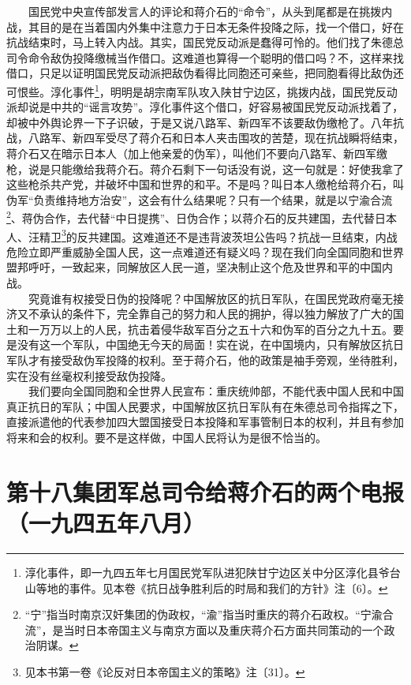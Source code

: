 \documentclass[cn,11pt,chinese]{elegantbook}
\def\myformat#1{\hfil\hfil #1}
\begin{document}
　　国民党中央宣传部发言人的评论和蒋介石的“命令”，从头到尾都是在挑拨内战，其目的是在当着国内外集中注意力于日本无条件投降之际，找一个借口，好在抗战结束时，马上转入内战。其实，国民党反动派是蠢得可怜的。他们找了朱德总司令命令敌伪投降缴械当作借口。这难道也算得一个聪明的借口吗？不，这样来找借口，只足以证明国民党反动派把敌伪看得比同胞还可亲些，把同胞看得比敌伪还可恨些。淳化事件\footnote[5]{ 淳化事件，即一九四五年七月国民党军队进犯陕甘宁边区关中分区淳化县爷台山等地的事件。见本卷《抗日战争胜利后的时局和我们的方针》注〔6〕。}，明明是胡宗南军队攻入陕甘宁边区，挑拨内战，国民党反动派却说是中共的“谣言攻势”。淳化事件这个借口，好容易被国民党反动派找着了，却被中外舆论界一下子识破，于是又说八路军、新四军不该要敌伪缴枪了。八年抗战，八路军、新四军受尽了蒋介石和日本人夹击围攻的苦楚，现在抗战瞬将结束，蒋介石又在暗示日本人（加上他亲爱的伪军），叫他们不要向八路军、新四军缴枪，说是只能缴给我蒋介石。蒋介石剩下一句话没有说，这一句就是：好使我拿了这些枪杀共产党，并破坏中国和世界的和平。不是吗？叫日本人缴枪给蒋介石，叫伪军“负责维持地方治安”，这会有什么结果呢？只有一个结果，就是以宁渝合流\footnote[6]{ “宁”指当时南京汉奸集团的伪政权，“渝”指当时重庆的蒋介石政权。“宁渝合流”，是当时日本帝国主义与南京方面以及重庆蒋介石方面共同策动的一个政治阴谋。}、蒋伪合作，去代替“中日提携”、日伪合作；以蒋介石的反共建国，去代替日本人、汪精卫\footnote[7]{ 见本书第一卷《论反对日本帝国主义的策略》注〔31〕。}的反共建国。这难道还不是违背波茨坦公告吗？抗战一旦结束，内战危险立即严重威胁全国人民，这一点难道还有疑义吗？现在我们向全国同胞和世界盟邦呼吁，一致起来，同解放区人民一道，坚决制止这个危及世界和平的中国内战。\\
　　究竟谁有权接受日伪的投降呢？中国解放区的抗日军队，在国民党政府毫无接济又不承认的条件下，完全靠自己的努力和人民的拥护，得以独力解放了广大的国土和一万万以上的人民，抗击着侵华敌军百分之五十六和伪军的百分之九十五。要是没有这一个军队，中国绝无今天的局面！实在说，在中国境内，只有解放区抗日军队才有接受敌伪军投降的权利。至于蒋介石，他的政策是袖手旁观，坐待胜利，实在没有丝毫权利接受敌伪投降。\\
　　我们要向全国同胞和全世界人民宣布：重庆统帅部，不能代表中国人民和中国真正抗日的军队；中国人民要求，中国解放区抗日军队有在朱德总司令指挥之下，直接派遣他的代表参加四大盟国接受日本投降和军事管制日本的权利，并且有参加将来和会的权利。要不是这样做，中国人民将认为是很不恰当的。\\
\newpage\section*{\myformat{第十八集团军总司令给蒋介石的两个电报}\\\myformat{（一九四五年八月）}}
\end{document}
